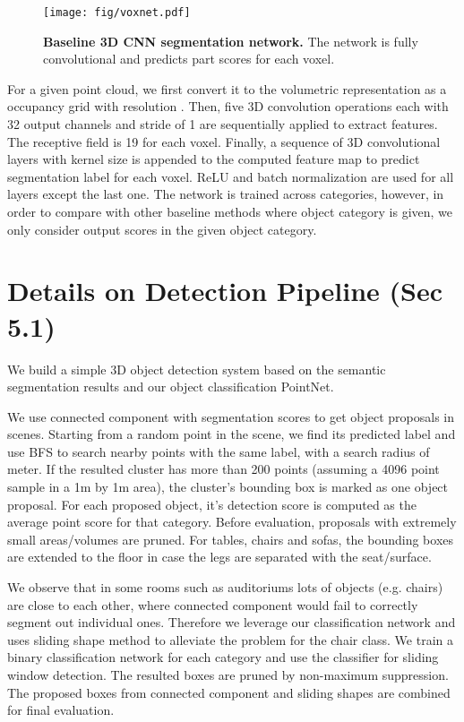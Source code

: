 \documentclass[10pt,twocolumn,letterpaper]{article}
\begin{document}
\begin{figure}[t!]
\centering
\texttt{[image: fig/voxnet.pdf]}
\caption{\textbf{Baseline 3D CNN segmentation network.} The network is fully convolutional and predicts part scores for each voxel.}
\label{fig:voxnet}
\end{figure}

For a given point cloud, we first convert it to the volumetric representation as a occupancy grid with resolution . Then, five 3D convolution operations each with 32 output channels and stride of 1 are sequentially applied to extract features. The receptive field is 19 for each voxel. Finally, a sequence of 3D convolutional layers with kernel size  is appended to the computed feature map to predict segmentation label for each voxel. ReLU and batch normalization are used for all layers except the last one. The network is trained across categories, however, in order to compare with other baseline methods where object category is given, we only consider output scores in the given object category.

\section{Details on Detection Pipeline (Sec 5.1)}
\label{sec:detection}
We build a simple 3D object detection system based on the semantic segmentation results and our object classification PointNet.

We use connected component with segmentation scores to get object proposals in scenes. Starting from a random point in the scene, we find its predicted label and use BFS to search nearby points with the same label, with a search radius of  meter. If the resulted cluster has more than 200 points (assuming a 4096 point sample in a 1m by 1m area), the cluster's bounding box is marked as one object proposal. For each proposed object, it's detection score is computed as the average point score for that category. Before evaluation, proposals with extremely small areas/volumes are pruned. For tables, chairs and sofas, the bounding boxes are extended to the floor in case the legs are separated with the seat/surface.

We observe that in some rooms such as auditoriums lots of objects (e.g. chairs) are close to each other, where connected component would fail to correctly segment out individual ones. Therefore we leverage our classification network and uses sliding shape method to alleviate the problem for the chair class. We train a binary classification network for each category and use the classifier for sliding window detection. The resulted boxes are pruned by non-maximum suppression. The proposed boxes from connected component and sliding shapes are combined for final evaluation.
\end{document}
